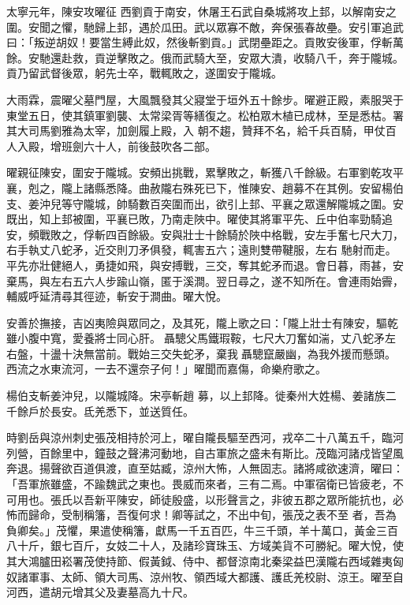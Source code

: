 \begin{pinyinscope}
 太寧元年，陳安攻曜征
 西劉貢于南安，休屠王石武自桑城將攻上邽，以解南安之圍。安聞之懼，馳歸上邽，遇於瓜田。武以眾寡不敵，奔保張春故壘。安引軍追武曰：「叛逆胡奴！要當生縛此奴，然後斬劉貢。」武閉壘距之。貢敗安後軍，俘斬萬餘。安馳還赴救，貢逆擊敗之。俄而武騎大至，安眾大潰，收騎八千，奔于隴城。貢乃留武督後眾，躬先士卒，戰輒敗之，遂圍安于隴城。



 大雨霖，震曜父墓門屋，大風飄發其父寢堂于垣外五十餘步。曜避正殿，素服哭于東堂五日，使其鎮軍劉襲、太常梁胥等繕復之。松柏眾木植已成林，至是悉枯。署其大司馬劉雅為太宰，加劍履上殿，入
 朝不趨，贊拜不名，給千兵百騎，甲仗百人入殿，增班劍六十人，前後鼓吹各二部。



 曜親征陳安，圍安于隴城。安頻出挑戰，累擊敗之，斬獲八千餘級。右軍劉乾攻平襄，剋之，隴上諸縣悉降。曲赦隴右殊死已下，惟陳安、趙募不在其例。安留楊伯支、姜沖兒等守隴城，帥騎數百突圍而出，欲引上邽、平襄之眾還解隴城之圍。安既出，知上邽被圍，平襄已敗，乃南走陜中。曜使其將軍平先、丘中伯率勁騎追安，頻戰敗之，俘斬四百餘級。安與壯士十餘騎於陜中格戰，安左手奮七尺大刀，右手執丈八蛇矛，近交則刀矛俱發，輒害五六；遠則雙帶鞬服，左右
 馳射而走。平先亦壯健絕人，勇捷如飛，與安搏戰，三交，奪其蛇矛而退。會日暮，雨甚，安棄馬，與左右五六人步踰山嶺，匿于溪澗。翌日尋之，遂不知所在。會連雨始霽，輔威呼延清尋其徑迹，斬安于澗曲。曜大悅。



 安善於撫接，吉凶夷險與眾同之，及其死，隴上歌之曰：「隴上壯士有陳安，驅乾雖小腹中寬，愛養將士同心肝。聶驄父馬鐵瑕鞍，七尺大刀奮如湍，丈八蛇矛左右盤，十盪十決無當前。戰始三交失蛇矛，棄我聶驄竄嚴幽，為我外援而懸頭。西流之水東流河，一去不還奈子何！」曜聞而嘉傷，命樂府歌之。



 楊伯支斬姜沖兒，以隴城降。宋亭斬趙
 募，以上邽降。徙秦州大姓楊、姜諸族二千餘戶於長安。氐羌悉下，並送質任。



 時劉岳與涼州刺史張茂相持於河上，曜自隴長驅至西河，戎卒二十八萬五千，臨河列營，百餘里中，鐘鼓之聲沸河動地，自古軍旅之盛未有斯比。茂臨河諸戍皆望風奔退。揚聲欲百道俱渡，直至姑臧，涼州大怖，人無固志。諸將咸欲速濟，曜曰：「吾軍旅雖盛，不踰魏武之東也。畏威而來者，三有二焉。中軍宿衛已皆疲老，不可用也。張氏以吾新平陳安，師徒殷盛，以形聲言之，非彼五郡之眾所能抗也，必怖而歸命，受制稱籓，吾復何求！卿等試之，不出中旬，張茂之表不至
 者，吾為負卿矣。」茂懼，果遣使稱籓，獻馬一千五百匹，牛三千頭，羊十萬口，黃金三百八十斤，銀七百斤，女妓二十人，及諸珍寶珠玉、方域美貨不可勝紀。曜大悅，使其大鴻臚田崧署茂使持節、假黃鉞、侍中、都督涼南北秦梁益巴漢隴右西域雜夷匈奴諸軍事、太師、領大司馬、涼州牧、領西域大都護、護氐羌校尉、涼王。曜至自河西，遣胡元增其父及妻墓高九十尺。




\end{pinyinscope}
